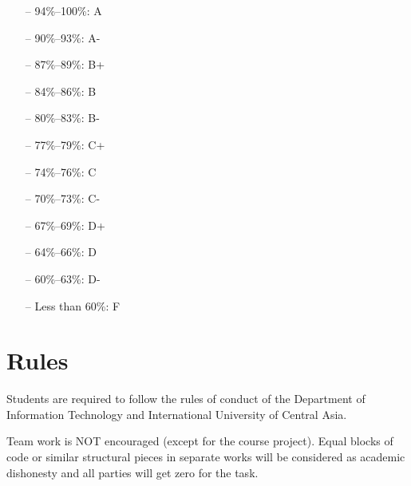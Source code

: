 \documentclass[12pt,a4paper,oneside]{article}
\begin{document}
        \begin{itemize} \itemsep-10pt \parskip0pt 
            \item[--] 94\%--100\%: A\\
            \item[--] 90\%--93\%: A-\\
            \item[--] 87\%--89\%: B+\\
            \item[--] 84\%--86\%: B\\
            \item[--] 80\%--83\%: B-\\
            \item[--] 77\%--79\%: C+\\
            \item[--] 74\%--76\%: C\\
            \item[--] 70\%--73\%: C-\\
            \item[--] 67\%--69\%: D+\\
            \item[--] 64\%--66\%: D\\
            \item[--] 60\%--63\%: D-\\
            \item[--] Less than 60\%: F
        \end{itemize}

    \section{Rules}

        Students are required to follow the rules of conduct of the
        Department of Information Technology and International University of Central Asia.

        Team work is NOT encouraged (except for the course project). Equal blocks of code
        or similar structural pieces in separate works will be considered as academic
        dishonesty and all parties will get zero for the task.
\end{document}
